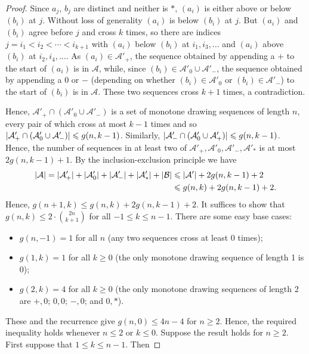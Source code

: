 \documentclass[a4paper,11pt]{article}
\renewcommand{\geq}{\geqslant}
\renewcommand{\leq}{\leqslant}
\DeclarePairedDelimiter{\abs}{\lvert}{\rvert} %
\renewcommand{\AA}{\mathcal{A}}
\newcommand{\BB}{\mathcal{B}}
\begin{document}
\begin{proof}
    Since $a_j$, $b_j$ are distinct and neither is $\ast$, $(a_i)$ is either above or below $(b_i)$ at $j$. Without loss of generality $(a_i)$ is below $(b_i)$ at $j$. But $(a_i)$ and $(b_i)$ agree before $j$ and cross $k$ times, so there are indices $j = i_1 < i_2 < \dotsb < i_{k + 1}$ with $(a_i)$ below $(b_i)$ at $i_1, i_3, \dotsc$ and $(a_i)$ above $(b_i)$ at $i_2, i_4, \dotsc$. As $(a_i) \in \AA'_{+}$, the sequence obtained by appending a $+$ to the start of $(a_i)$ is in $\AA$, while, since $(b_i) \in \AA'_{0} \cup \AA'_{-}$, the sequence obtained by appending a $0$ or $-$ (depending on whether $(b_i) \in \AA'_{0}$ or $(b_i) \in \AA'_{-}$) to the start of $(b_i)$ is in $\AA$. These two sequences cross $k + 1$ times, a contradiction.

    Hence, $\AA'_{+} \cap (\AA'_{0} \cup \AA'_{-})$ is a set of monotone drawing sequences of length $n$, every pair of which cross at most $k - 1$ times and so $\abs{\AA'_{+} \cap (\AA'_{0} \cup \AA'_{-})} \leq g(n, k - 1)$. Similarly, $\abs{\AA'_{-} \cap (\AA'_{0} \cup \AA'_{+})} \leq g(n, k - 1)$. Hence, the number of sequences in at least two of $\AA'_{+}, \AA'_{0}, \AA'_{-}, \AA'_{\ast}$ is at most $2 g(n, k - 1) + 1$. By the inclusion-exclusion principle we have
    \begin{align*}
       \abs{\AA}  
       = \abs{\AA'_{+}} + \abs{\AA'_{0}} + \abs{\AA'_{-}} + \abs{\AA'_{\ast}} + \abs{\BB} 
        & \leq \abs{\AA'} + 2g(n, k - 1) + 2 \\
        & \leq g(n, k) + 2g(n, k - 1) + 2.
    \end{align*}
    Hence, $g(n + 1, k) \leq g(n, k) + 2g(n, k - 1) + 2$. It suffices to show that $g(n, k) \leq 2 \cdot \binom{2n}{k + 1}$ for all $-1 \leq k \leq n - 1$. There are some easy base cases:
    \begin{itemize}
        \item $g(n, -1) = 1$ for all $n$ (any two sequences cross at least 0 times);
        \item $g(1, k) = 1$ for all $k \geq 0$ (the only monotone drawing sequence of length 1 is $0$);
        \item $g(2, k) = 4$ for all $k \geq 0$ (the only monotone drawing sequences of length 2 are $+, 0$; $0,0$; $-, 0$; and $0,\ast$).
    \end{itemize}
    These and the recurrence give $g(n, 0) \leq 4n - 4$ for $n \geq 2$. Hence, the required inequality holds whenever $n \leq 2$ or $k \leq 0$. Suppose the result holds for $n \geq 2$. First suppose that $1 \leq k \leq n - 1$. Then

\end{proof}
\end{document}
